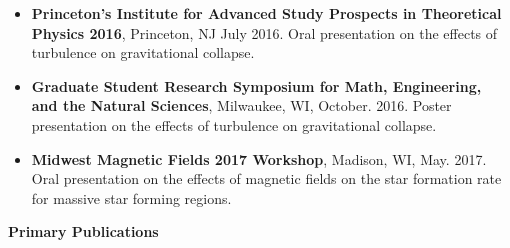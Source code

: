 \documentclass[12pt,notitlepage]{report}
\begin{document}
\bigskip
{}
\medskip

%		

\bigskip
{}


\begin{itemize}


\item[]{\bf Princeton’s Institute for Advanced Study Prospects in Theoretical Physics 2016}, Princeton, NJ July 2016. Oral presentation on the effects of turbulence on gravitational collapse.

\item[]{\bf Graduate Student Research Symposium for Math, Engineering, and the Natural Sciences}, Milwaukee, WI, October. 2016. Poster presentation on the effects of turbulence on gravitational collapse.

\item[]{\bf Midwest Magnetic Fields 2017 Workshop}, Madison, WI, May. 2017. Oral presentation on the effects of magnetic fields on the star formation rate for massive star forming regions.

\end{itemize}

\bigskip
{}

\textbf{Primary Publications}
\end{document}
